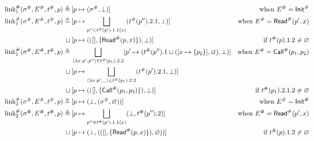 \documentclass{article}
\begin{document}
\begin{align*}
	\Abs\link_1(\Abs\ctx,\Abs\event,\Abs\ptree,p) \triangleq & \: [p\mapsto(\Abs\ctx,\bot)]                                                                                                                & \text{when }\Abs\event=\Abs\InitE              \\
	\Abs\link_1(\Abs\ctx,\Abs\event,\Abs\ptree,p) \triangleq & \: [p\mapsto\bigsqcup_{p''\in\Abs\ptree(p').1.1(x)}(\Abs\ptree(p'').2.1,\bot)]                                                              & \text{when }\Abs\event=\Abs\ReadE(p',x)        \\
	\sqcup                                                   & \: [p\mapsto(([],\{\Abs\ReadE(p,x)\}),\bot)]                                                                                                & \text{if }\Abs\ptree(p).1.2\neq\varnothing     \\
	\Abs\link_1(\Abs\ctx,\Abs\event,\Abs\ptree,p) \triangleq & \: \bigsqcup_{\langle\lambda x.p',p''\rangle\in\Abs\ptree(p_1).2.2}[p'\mapsto(\Abs\ptree(p'').1\sqcup([x\mapsto\{p_2\}],\varnothing),\bot)] & \text{when }\Abs\event=\Abs\CallE(p_1,p_2)     \\
	\sqcup                                                   & \: [p\mapsto\bigsqcup_{\langle\lambda x.p',\_\rangle\in\Abs\ptree(p_1).2.2}(\Abs\ptree(p').2.1,\bot)]                                                                                        \\
	\sqcup                                                   & \: [p\mapsto(([],\{\Abs\CallE(p_1,p_2)\}),\bot)]                                                                                            & \text{if }\Abs\ptree(p_1).2.1.2\neq\varnothing \\
	\Abs\link_2(\Abs\ctx,\Abs\event,\Abs\ptree,p) \triangleq & \: [p\mapsto(\bot,(\Abs\ctx,\varnothing))]                                                                                                  & \text{when }\Abs\event=\Abs\InitE              \\
	\Abs\link_2(\Abs\ctx,\Abs\event,\Abs\ptree,p) \triangleq & \: [p\mapsto\bigsqcup_{p''\in\Abs\ptree(p').1.1(x)}(\bot,\Abs\ptree(p'').2)]                                                                & \text{when }\Abs\event=\Abs\ReadE(p',x)        \\
	\sqcup                                                   & \: [p\mapsto(\bot,(([],\{\Abs\ReadE(p,x)\}),\varnothing))]                                                                                  & \text{if }\Abs\ptree(p).1.2\neq\varnothing     \\

\end{align*}
\end{document}
